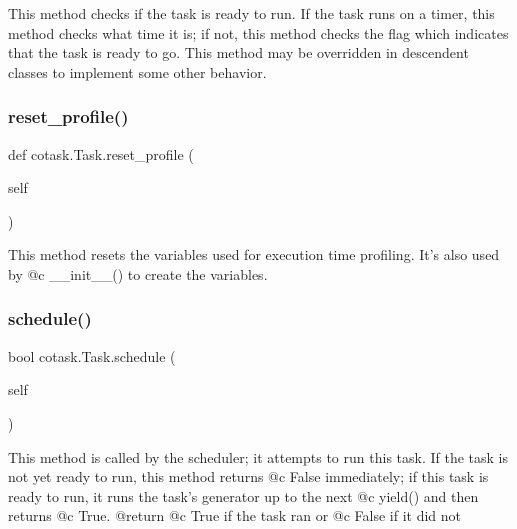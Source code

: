 \begin{DoxyVerb}This method checks if the task is ready to run. If the task
runs on a timer, this method checks what time it is; if not, this 
method checks the flag which indicates that the task is ready to go. 
This method may be overridden in descendent classes to implement some 
other behavior. \end{DoxyVerb}
 \mbox{\label{classcotask_1_1_task_a1bcbfa7dd7086112af20b7247ffa4a2e}} 
\subsubsection{\texorpdfstring{reset\_profile()}{reset\_profile()}}
{\footnotesize\ttfamily def cotask.\+Task.\+reset\+\_\+profile (\begin{DoxyParamCaption}\item[{}]{self }\end{DoxyParamCaption})}

\begin{DoxyVerb}This method resets the variables used for execution time 
profiling. It's also used by @c __init__() to create the variables.
\end{DoxyVerb}
 \mbox{\label{classcotask_1_1_task_af60def0ed4a1bc5fec32f3cf8b8a90c8}} 
\subsubsection{\texorpdfstring{schedule()}{schedule()}}
{\footnotesize\ttfamily  bool cotask.\+Task.\+schedule (\begin{DoxyParamCaption}\item[{}]{self }\end{DoxyParamCaption})}

\begin{DoxyVerb}This method is called by the scheduler; it attempts to run this 
task. If the task is not yet ready to run, this method returns 
@c False immediately; if this task is ready to run, it runs the 
task's generator up to the next @c yield() and then returns @c True.
@return @c True if the task ran or @c False if it did not
\end{DoxyVerb}
 

